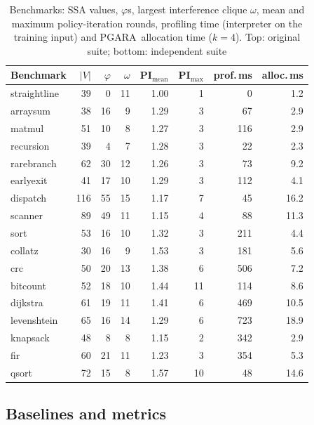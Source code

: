\documentclass{ieeeaccess}
\newcommand{\MG}{PGARA}
\begin{document}
\begin{table}[t]
\centering
\caption{Benchmarks: SSA values, $\varphi$s, largest interference
clique $\omega$, mean and maximum policy-iteration rounds, profiling
time (interpreter on the training input) and \MG\ allocation time
($k=4$). Top: original suite; bottom: independent suite}
\label{tab:bench}
\footnotesize
\setlength{\tabcolsep}{3.2pt}
\begin{tabular}{@{}lrrrrrrr@{}}
\toprule
Benchmark & $|V|$ & $\varphi$ & $\omega$ & PI$_{\text{mean}}$ & PI$_{\max}$ & prof.\,ms & alloc.\,ms \\
\midrule
straightline & 39 & 0 & 11 & 1.00 & 1 & 0 & 1.2 \\
arraysum & 38 & 16 & 9 & 1.29 & 3 & 67 & 2.9 \\
matmul & 51 & 10 & 8 & 1.27 & 3 & 116 & 2.9 \\
recursion & 39 & 4 & 7 & 1.28 & 3 & 22 & 2.3 \\
rarebranch & 62 & 30 & 12 & 1.26 & 3 & 73 & 9.2 \\
earlyexit & 41 & 17 & 10 & 1.29 & 3 & 112 & 4.1 \\
dispatch & 116 & 55 & 15 & 1.17 & 7 & 45 & 16.2 \\
scanner & 89 & 49 & 11 & 1.15 & 4 & 88 & 11.3 \\
sort & 53 & 16 & 10 & 1.32 & 3 & 211 & 4.4 \\
collatz & 30 & 16 & 9 & 1.53 & 3 & 181 & 5.6 \\
\midrule
crc & 50 & 20 & 13 & 1.38 & 6 & 506 & 7.2 \\
bitcount & 52 & 18 & 10 & 1.44 & 11 & 114 & 8.6 \\
dijkstra & 61 & 19 & 11 & 1.41 & 6 & 469 & 10.5 \\
levenshtein & 65 & 16 & 14 & 1.29 & 6 & 723 & 18.9 \\
knapsack & 48 & 8 & 8 & 1.15 & 2 & 342 & 2.9 \\
fir & 60 & 21 & 11 & 1.23 & 3 & 354 & 5.3 \\
qsort & 72 & 15 & 8 & 1.57 & 10 & 48 & 14.6 \\
\bottomrule
\end{tabular}
\end{table}

\subsection{Baselines and metrics}
\end{document}
